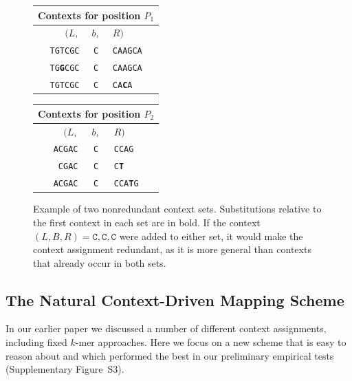 \begin{figure}
  \begin{minipage}{0.5\linewidth}
  \centering
  \begin{tabular}{rcl}
  \multicolumn{3}{c}{Contexts for position $P_1$} \\ \hline
  $(L,$ & $b,$ & $R)$ \\ 
  \texttt{TGTCGC} & \texttt{C} & \texttt{CAAGCA} \\ 
  \texttt{TG\textbf{G}CGC} & \texttt{C} & \texttt{CAAGCA} \\ 
  \texttt{TGTCGC} & \texttt{C} & \texttt{CA\textbf{C}A} \\ 
  \end{tabular}
  \end{minipage}%
  \begin{minipage}{0.5\linewidth}
  \centering
  \begin{tabular}{rcl}
  \multicolumn{3}{c}{Contexts for position $P_2$} \\ \hline
  $(L,$ & $b,$ & $R)$ \\ 
  \texttt{ACGAC} & \texttt{C} & \texttt{CCAG} \\ 
  \texttt{CGAC} & \texttt{C} & \texttt{C\textbf{T}} \\ 
  \texttt{ACGAC} & \texttt{C} & \texttt{CCA\textbf{T}G} \\
  \end{tabular}
  \end{minipage}

  \caption[Example of two nonredundant context sets]{Example of two nonredundant context sets. Substitutions relative to the first context in each set are in bold. If the context $(L, B, R) = \texttt{C}, \texttt{C}, \texttt{C}$ were added to either set, it would make the context assignment redundant, as it is more general than contexts that already occur in both sets.}
  \label{fig:contextSets}
\end{figure}

\subsection{The Natural Context-Driven Mapping Scheme}

In our earlier paper \citep{paten2014mapping} we discussed a number of different context assignments, including fixed $k$-mer approaches. Here we focus on a new scheme that is easy to reason about and which performed the best in our preliminary empirical tests (Supplementary Figure~S3).

